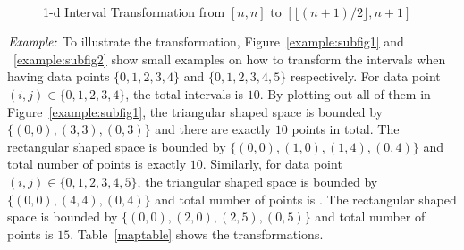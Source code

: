\documentclass[AMA,LATO1COL]{WileyNJD-v2-bak}
\begin{document}
\begin{figure}[h]
\centering
{}
~~
\caption{1-d Interval Transformation from $[n,n]$ to $[\lfloor (n+1)/2 \rfloor,n+1]$}\label{modelBF}
\end{figure}

$\noindent \textit {Example:}$ To illustrate the transformation, Figure~\ref{example:subfig1} and ~\ref{example:subfig2} show small examples on how to transform the intervals when having data points $\{0,1,2,3,4\}$ and $\{0,1,2,3,4,5\}$ respectively. For data point $(i,j)\in \{0,1,2,3,4\}$, the total intervals is $10$. By plotting out all of them in Figure~\ref{example:subfig1}, the triangular shaped space is bounded by $\{(0,0), (3,3), (0,3)\}$ and there are exactly $10$ points in total. The rectangular shaped space is bounded by $\{(0,0),(1,0), (1,4),(0,4)\}$ and total number of points is exactly $10$. Similarly, for data point $(i,j)\in \{0,1,2,3,4,5\}$,  the triangular shaped space is bounded by $\{(0,0),(4,4),(0,4)\}$ and total number of points is . The rectangular shaped space is bounded by $\{(0,0),(2,0),(2,5),(0,5)\}$ and total number of points is $15$. Table~\ref{maptable} shows the transformations.
\end{document}
